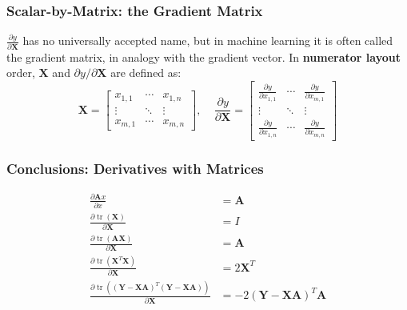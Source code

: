 \documentclass{beamer}
\DeclareMathOperator{\tr}{tr}
\begin{document}
\begin{frame}
  \frametitle{Scalar-by-Matrix: the Gradient Matrix}

  $\frac{\partial y}{\partial\mathbf{X}}$ has no universally accepted
  name, but in machine learning it is often called the gradient
  matrix, in analogy with the gradient vector.  In {\bf numerator
    layout} order, $\mathbf{X}$ and $\partial y/\partial\mathbf{X}$
  are defined as:
  \begin{displaymath}
    \mathbf{X}=
    \left[\begin{array}{ccc}
        x_{1,1}&\cdots&x_{1,n}\\
        \vdots&\ddots&\vdots\\
        x_{m,1}&\cdots&x_{m,n}
      \end{array}\right],~~~~~
    \frac{\partial y}{\partial\mathbf{X}}=
    \left[\begin{array}{ccc}
        \frac{\partial y}{\partial x_{1,1}}&\cdots&\frac{\partial y}{\partial x_{m,1}}\\
        \vdots&\ddots&\vdots\\
        \frac{\partial y}{\partial x_{1,n}}&\cdots&\frac{\partial y}{\partial x_{m,n}}
      \end{array}\right]
  \end{displaymath}
\end{frame}

\begin{frame}
  \frametitle{Conclusions: Derivatives with Matrices}
  \begin{align*}
    \frac{\partial \mathbf{A}x}{\partial x} &= \mathbf{A}\\
    \frac{\partial\tr(\mathbf{X})}{\partial\mathbf{X}} &= I\\
    \frac{\partial\tr(\mathbf{A}\mathbf{X})}{\partial\mathbf{X}} &= \mathbf{A}\\
    \frac{\partial\tr(\mathbf{X}^T\mathbf{X})}{\partial\mathbf{X}} &=2\mathbf{X}^T\\
    \frac{\partial\tr((\mathbf{Y}-\mathbf{X}\mathbf{A})^T(\mathbf{Y}-\mathbf{X}\mathbf{A}))}{\partial\mathbf{X}}
    &=
    -2\left(\mathbf{Y}-\mathbf{X}\mathbf{A}\right)^T\mathbf{A}
  \end{align*}    
\end{frame}
\end{document}
